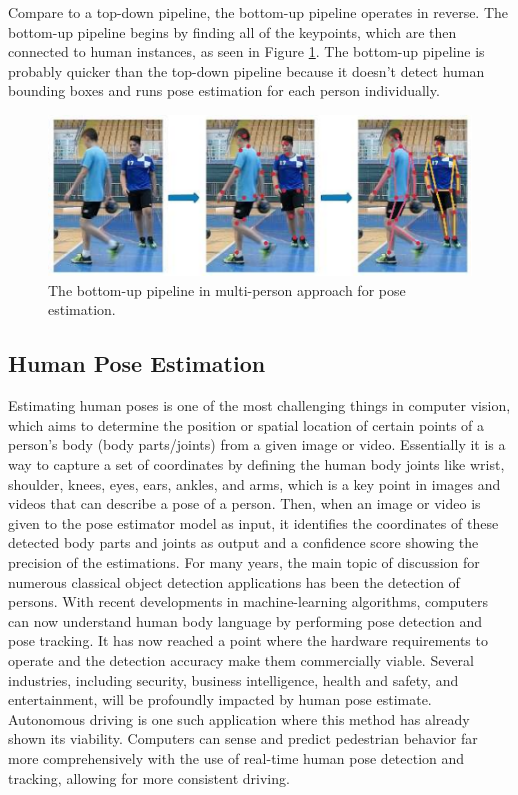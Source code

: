 Compare to a top-down pipeline, the bottom-up pipeline operates in reverse. The bottom-up pipeline begins by finding all of the keypoints, which are then connected to human instances, as seen in Figure \ref{fig:bottom-up-approach}. 
The bottom-up pipeline is probably quicker than the top-down pipeline because it doesn't detect human bounding boxes and runs pose estimation for each person individually.

\begin{figure}[ht]
  \centering
  \includegraphics[scale=1.2]{gambar/bottom-up-approach.png}
  \caption{The bottom-up pipeline in multi-person approach for pose estimation.}
  \label{fig:bottom-up-approach}
\end{figure}

\subsection{Human Pose Estimation}
\label{subsec:humanposeestimation}

Estimating human poses is one of the most challenging things in computer vision, which aims to determine the position or spatial location of certain points of a person's body (body parts/joints) from a given image or video.
Essentially it is a way to capture a set of coordinates by defining the human body joints like wrist, shoulder, knees, eyes, ears, ankles, and arms, which is a key point in images and videos that can describe a pose of a person. Then, when an image or video is given to the pose estimator model as input, it identifies the coordinates of these detected body parts and joints as output and a confidence score showing the precision of the estimations.
For many years, the main topic of discussion for numerous classical object detection applications has been the detection of persons.
With recent developments in machine-learning algorithms, computers can now understand human body language by performing pose detection and pose tracking. It has now reached a point where the hardware requirements to operate and the detection accuracy make them commercially viable.
Several industries, including security, business intelligence, health and safety, and entertainment, will be profoundly impacted by human pose estimate. Autonomous driving is one such application where this method has already shown its viability. Computers can sense and predict pedestrian behavior far more comprehensively with the use of real-time human pose detection and tracking, allowing for more consistent driving.

